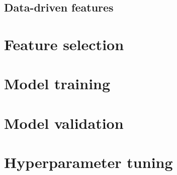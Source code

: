 \subsection{Data-driven features}

\section{Feature selection}
\section{Model training}
\section{Model validation}
\section{Hyperparameter tuning}